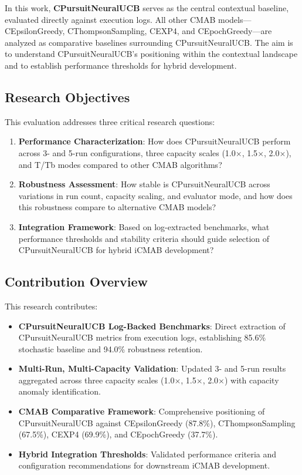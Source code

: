 \documentclass[12pt,a4paper]{article}
\newcommand{\primarytext}[1]{\textcolor{primaryblue}{\textbf{#1}}}
\begin{document}
In this work, \primarytext{CPursuitNeuralUCB} serves as the central contextual baseline, evaluated directly against execution logs. All other CMAB models---CEpsilonGreedy, CThompsonSampling, CEXP4, and CEpochGreedy---are analyzed as comparative baselines surrounding CPursuitNeuralUCB. The aim is to understand CPursuitNeuralUCB's positioning within the contextual landscape and to establish performance thresholds for hybrid development.

\subsection{Research Objectives}

This evaluation addresses three critical research questions:

\begin{enumerate}
    \item \textbf{Performance Characterization}: How does CPursuitNeuralUCB perform across 3- and 5-run configurations, three capacity scales (1.0$\times$, 1.5$\times$, 2.0$\times$), and T/Tb modes compared to other CMAB algorithms?
    \item \textbf{Robustness Assessment}: How stable is CPursuitNeuralUCB across variations in run count, capacity scaling, and evaluator mode, and how does this robustness compare to alternative CMAB models?
    \item \textbf{Integration Framework}: Based on log-extracted benchmarks, what performance thresholds and stability criteria should guide selection of CPursuitNeuralUCB for hybrid iCMAB development?
\end{enumerate}

\subsection{Contribution Overview}

This research contributes:

\begin{itemize}
    \item \textbf{CPursuitNeuralUCB Log-Backed Benchmarks}: Direct extraction of CPursuitNeuralUCB metrics from execution logs, establishing 85.6\% stochastic baseline and 94.0\% robustness retention.
    \item \textbf{Multi-Run, Multi-Capacity Validation}: Updated 3- and 5-run results aggregated across three capacity scales (1.0$\times$, 1.5$\times$, 2.0$\times$) with capacity anomaly identification.
    \item \textbf{CMAB Comparative Framework}: Comprehensive positioning of CPursuitNeuralUCB against CEpsilonGreedy (87.8\%), CThompsonSampling (67.5\%), CEXP4 (69.9\%), and CEpochGreedy (37.7\%).
    \item \textbf{Hybrid Integration Thresholds}: Validated performance criteria and configuration recommendations for downstream iCMAB development.
\end{itemize}
\end{document}
